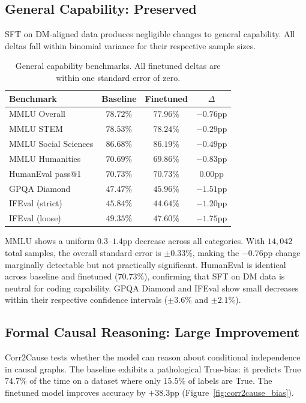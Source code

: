 \documentclass[11pt]{article}
\begin{document}
\subsection{General Capability: Preserved}

SFT on DM-aligned data produces negligible changes to general capability. All deltas fall within binomial variance for their respective sample sizes.

\begin{table}
\caption{General capability benchmarks. All finetuned deltas are within one standard error of zero.}
\label{tab:general}
\begin{tabular}{lccc}
\toprule
Benchmark & Baseline & Finetuned & $\Delta$ \\
\midrule
MMLU Overall & $78.72\%$ & $77.96\%$ & $-0.76$pp \\
MMLU STEM & $78.53\%$ & $78.24\%$ & $-0.29$pp \\
MMLU Social Sciences & $86.68\%$ & $86.19\%$ & $-0.49$pp \\
MMLU Humanities & $70.69\%$ & $69.86\%$ & $-0.83$pp \\
HumanEval pass@1 & $70.73\%$ & $70.73\%$ & $0.00$pp \\
GPQA Diamond & $47.47\%$ & $45.96\%$ & $-1.51$pp \\
IFEval (strict) & $45.84\%$ & $44.64\%$ & $-1.20$pp \\
IFEval (loose) & $49.35\%$ & $47.60\%$ & $-1.75$pp \\
\bottomrule
\end{tabular}
\end{table}

MMLU shows a uniform $0.3$--$1.4$pp decrease across all categories. With $14{,}042$ total samples, the overall standard error is $\pm0.33\%$, making the $-0.76$pp change marginally detectable but not practically significant. HumanEval is identical across baseline and finetuned ($70.73\%$), confirming that SFT on DM data is neutral for coding capability. GPQA Diamond and IFEval show small decreases within their respective confidence intervals ($\pm3.6\%$ and $\pm2.1\%$).

\subsection{Formal Causal Reasoning: Large Improvement}

Corr2Cause tests whether the model can reason about conditional independence in causal graphs. The baseline exhibits a pathological True-bias: it predicts True $74.7\%$ of the time on a dataset where only $15.5\%$ of labels are True. The finetuned model improves accuracy by $+38.3$pp (Figure~\ref{fig:corr2cause_bias}).
\end{document}
